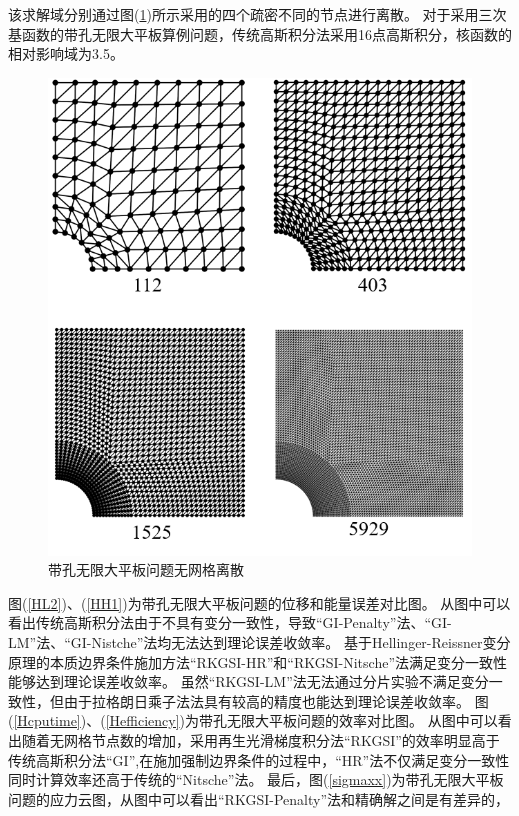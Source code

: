 该求解域分别通过图(\ref{hole.mesh})所示采用的四个疏密不同的节点进行离散。
对于采用三次基函数的带孔无限大平板算例问题，传统高斯积分法采用16点高斯积分，核函数的相对影响域为3.5。\par
\begin{figure}[H]
\centering
 \includegraphics[scale=0.7]{figure/EHR/hole/hole.mesh.png}
   \caption{带孔无限大平板问题无网格离散}\label{hole.mesh}
\end{figure}
图(\ref{HL2})、(\ref{HH1})为带孔无限大平板问题的位移和能量误差对比图。
从图中可以看出传统高斯积分法由于不具有变分一致性，导致“GI-Penalty”法、“GI-LM”法、“GI-Nistche”法均无法达到理论误差收敛率。
基于Hellinger-Reissner变分原理的本质边界条件施加方法“RKGSI-HR”和“RKGSI-Nitsche”法满足变分一致性能够达到理论误差收敛率。
虽然“RKGSI-LM”法无法通过分片实验不满足变分一致性，但由于拉格朗日乘子法法具有较高的精度也能达到理论误差收敛率。
图(\ref{Hcputime})、(\ref{Hefficiency})为带孔无限大平板问题的效率对比图。
从图中可以看出随着无网格节点数的增加，采用再生光滑梯度积分法“RKGSI”的效率明显高于传统高斯积分法“GI”,在施加强制边界条件的过程中，“HR”法不仅满足变分一致性同时计算效率还高于传统的“Nitsche”法。
最后，图(\ref{sigmaxx})为带孔无限大平板问题的应力云图，从图中可以看出“RKGSI-Penalty”法和精确解之间是有差异的，
